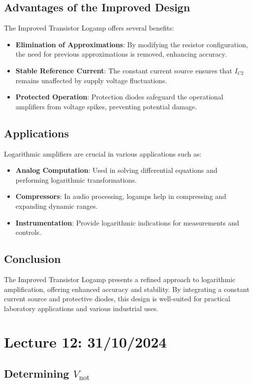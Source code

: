 \subsection{Advantages of the Improved Design}
The Improved Transistor Logamp offers several benefits:
\begin{itemize}
    \item \textbf{Elimination of Approximations}: By modifying the resistor configuration, the need for previous approximations is removed, enhancing accuracy.
    \item \textbf{Stable Reference Current}: The constant current source ensures that \( I_{C2} \) remains unaffected by supply voltage fluctuations.
    \item \textbf{Protected Operation}: Protection diodes safeguard the operational amplifiers from voltage spikes, preventing potential damage.
\end{itemize}

\subsection{Applications}
Logarithmic amplifiers are crucial in various applications such as:
\begin{itemize}
    \item \textbf{Analog Computation}: Used in solving differential equations and performing logarithmic transformations.
    \item \textbf{Compressors}: In audio processing, logamps help in compressing and expanding dynamic ranges.
    \item \textbf{Instrumentation}: Provide logarithmic indications for measurements and controls.
\end{itemize}

\subsection{Conclusion}
The Improved Transistor Logamp presents a refined approach to logarithmic amplification, offering enhanced accuracy and stability. By integrating a constant current source and protective diodes, this design is well-suited for practical laboratory applications and various industrial uses.
\newpage
\section*{Lecture 12: 31/10/2024}

\subsection*{Determining \( V_{\text{not}} \)}


